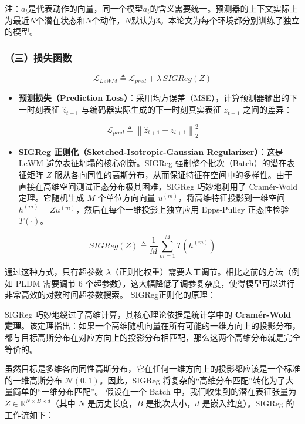 注：\(a_t\)是代表动作的向量，同一个模型\(a_t\)的含义需要统一。预测器的上下文实际上为最近\(N\)个潜在状态和\(N\)个动作，\(N\)默认为3。本论文为每个环境都分别训练了独立的模型。

\hypertarget{ux4e09ux635fux5931ux51fdux6570-1}{%
\subsubsection{（三）损失函数}\label{ux4e09ux635fux5931ux51fdux6570-1}}

\[
\mathcal{L}_{LeWM} \triangleq \mathcal{L}_{pred} + \lambda\,SIGReg(Z)
\]

\begin{itemize}
\tightlist
\item
  \textbf{预测损失（Prediction Loss）}：采用均方误差（MSE），计算预测器输出的下一时刻表征 \(\hat{z}_{t+1}\) 与编码器实际生成的下一时刻真实表征 \(z_{t+1}\) 之间的差异：
\end{itemize}

\[
\mathcal{L}_{pred} \triangleq \left\|\hat{z}_{t+1}-z_{t+1}\right\|_2^2
\]

\begin{itemize}
\tightlist
\item
  \textbf{SIGReg 正则化（Sketched-Isotropic-Gaussian Regularizer）}：这是 LeWM 避免表征坍塌的核心创新。SIGReg 强制整个批次（Batch）的潜在表征矩阵 \(Z\) 服从各向同性的高斯分布，从而保证特征在空间中的多样性。由于直接在高维空间测试正态分布极其困难，SIGReg 巧妙地利用了 Cramér-Wold 定理。它随机生成 \(M\) 个单位方向向量 \(u^{(m)}\)，将高维特征投影到一维空间 \(h^{(m)} = Zu^{(m)}\)，然后在每个一维投影上独立应用 Epps-Pulley 正态性检验 \(T(\cdot)\)。
\end{itemize}

\[
SIGReg(Z) \triangleq \frac{1}{M}\sum_{m=1}^{M} T(h^{(m)})
\]

通过这种方式，只有超参数 \(\lambda\)（正则化权重）需要人工调节。相比之前的方法（例如 PLDM 需要调节 \(6\) 个超参数），这大幅降低了调参复杂度，使得模型可以进行非常高效的对数时间超参数搜索。
SIGReg正则化的原理：

SIGReg 巧妙地绕过了高维计算，其核心理论依据是统计学中的 \textbf{Cramér-Wold 定理}。该定理指出：如果一个高维随机向量在所有可能的一维方向上的投影分布，都与目标高斯分布在对应方向上的投影分布相匹配，那么这两个高维分布就是完全等价的。

虽然目标是多维各向同性高斯分布，它在任何一维方向上的投影都应该是一个标准的一维高斯分布 \(\mathcal{N}(0,1)\)。因此，SIGReg 将复杂的``高维分布匹配''转化为了大量简单的``一维分布匹配''。
假设在一个 Batch 中，我们收集到的潜在表征张量为 \(Z \in \mathbb{R}^{N\times B\times d}\)（其中 \(N\) 是历史长度，\(B\) 是批次大小，\(d\) 是嵌入维度）。SIGReg 的工作流如下：

